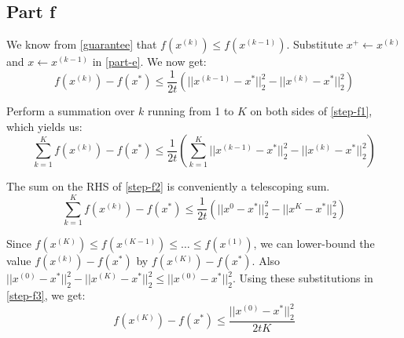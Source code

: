 \documentclass[11pt]{article}
\begin{document}
\subsection*{Part f}
\begin{flushleft}
We know from \ref{guarantee} that \(f(x^{(k)}) \leq f(x^{(k-1)})\). Substitute \(x^{+} \leftarrow x^{(k)}\) and \(x \leftarrow x^{(k-1)}\) in \ref{part-e}. We now get:
\begin{equation}
\label{step-f1}
f(x^{(k)}) - f(x^{*}) \leq \frac{1}{2t}\left(||x^{(k-1)} - x^{*}||_{2}^{2} - ||x^{(k)} - x^{*}||_2^{2}\right)
\end{equation}

Perform a summation over \(k\) running from 1 to \(K\) on both sides of \ref{step-f1}, which yields us:
\begin{equation}
\label{step-f2}
\displaystyle \sum_{k=1}^{K} f(x^{(k)}) - f(x^{*}) \leq \frac{1}{2t} \left(\sum_{k=1}^{K} ||x^{(k-1)} - x^{*}||_{2}^{2} - ||x^{(k)} - x^{*}||_2^{2}\right)
\end{equation}

The sum on the RHS of \ref{step-f2} is conveniently a telescoping sum.
\begin{equation}
\label{step-f3}
\displaystyle \sum_{k=1}^{K} f(x^{(k)}) - f(x^{*}) \leq \frac{1}{2t} \left(||x^{0} - x^{*}||_{2}^{2} - ||x^{K} - x^{*}||_{2}^{2}\right)
\end{equation}

Since \(f(x^{(K)}) \leq f(x^{(K-1)}) \leq \ldots \leq f(x^{(1)})\), we can lower-bound the value \(f(x^{(k)}) - f(x^{*})\) by \(f(x^{(K)}) - f(x^{*})\). Also \(||x^{(0)} - x^{*}||_{2}^{2} - ||x^{(K)} - x^{*}||_{2}^{2} \leq ||x^{(0)} - x^{*}||_{2}^{2}\). Using these substitutions in \ref{step-f3}, we get:
\begin{equation}
\label{part-f}
f(x^{(K)}) - f(x^{*}) \leq \frac{||x^{(0)} - x^{*}||_{2}^{2}}{2tK}
\end{equation}
\end{flushleft}
\end{document}
